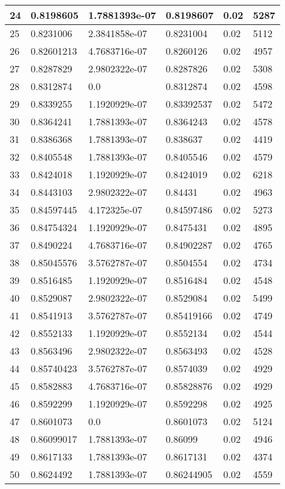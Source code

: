\begin{longtable}{|l|l|l|l|l|l|}
24 & 0.8198605 & 1.7881393e-07 & 0.8198607 & 0.02 & 5287 \\ \hline 
25 & 0.8231006 & 2.3841858e-07 & 0.8231004 & 0.02 & 5112 \\ \hline 
26 & 0.82601213 & 4.7683716e-07 & 0.8260126 & 0.02 & 4957 \\ \hline 
27 & 0.8287829 & 2.9802322e-07 & 0.8287826 & 0.02 & 5308 \\ \hline 
28 & 0.8312874 & 0.0 & 0.8312874 & 0.02 & 4598 \\ \hline 
29 & 0.8339255 & 1.1920929e-07 & 0.83392537 & 0.02 & 5472 \\ \hline 
30 & 0.8364241 & 1.7881393e-07 & 0.8364243 & 0.02 & 4578 \\ \hline 
31 & 0.8386368 & 1.7881393e-07 & 0.838637 & 0.02 & 4419 \\ \hline 
32 & 0.8405548 & 1.7881393e-07 & 0.8405546 & 0.02 & 4579 \\ \hline 
33 & 0.8424018 & 1.1920929e-07 & 0.8424019 & 0.02 & 6218 \\ \hline 
34 & 0.8443103 & 2.9802322e-07 & 0.84431 & 0.02 & 4963 \\ \hline 
35 & 0.84597445 & 4.172325e-07 & 0.84597486 & 0.02 & 5273 \\ \hline 
36 & 0.84754324 & 1.1920929e-07 & 0.8475431 & 0.02 & 4895 \\ \hline 
37 & 0.8490224 & 4.7683716e-07 & 0.84902287 & 0.02 & 4765 \\ \hline 
38 & 0.85045576 & 3.5762787e-07 & 0.8504554 & 0.02 & 4734 \\ \hline 
39 & 0.8516485 & 1.1920929e-07 & 0.8516484 & 0.02 & 4548 \\ \hline 
40 & 0.8529087 & 2.9802322e-07 & 0.8529084 & 0.02 & 5499 \\ \hline 
41 & 0.8541913 & 3.5762787e-07 & 0.85419166 & 0.02 & 4749 \\ \hline 
42 & 0.8552133 & 1.1920929e-07 & 0.8552134 & 0.02 & 4544 \\ \hline 
43 & 0.8563496 & 2.9802322e-07 & 0.8563493 & 0.02 & 4528 \\ \hline 
44 & 0.85740423 & 3.5762787e-07 & 0.8574039 & 0.02 & 4929 \\ \hline 
45 & 0.8582883 & 4.7683716e-07 & 0.85828876 & 0.02 & 4929 \\ \hline 
46 & 0.8592299 & 1.1920929e-07 & 0.8592298 & 0.02 & 4925 \\ \hline 
47 & 0.8601073 & 0.0 & 0.8601073 & 0.02 & 5124 \\ \hline 
48 & 0.86099017 & 1.7881393e-07 & 0.86099 & 0.02 & 4946 \\ \hline 
49 & 0.8617133 & 1.7881393e-07 & 0.8617131 & 0.02 & 4374 \\ \hline 
50 & 0.8624492 & 1.7881393e-07 & 0.86244905 & 0.02 & 4559 \\ \hline 
\end{longtable}